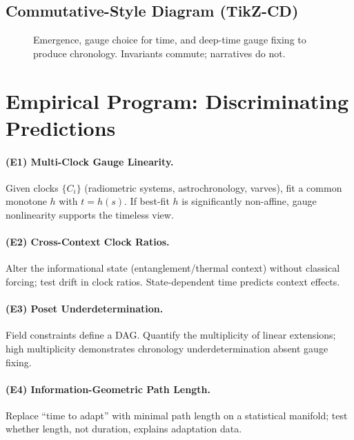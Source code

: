 \documentclass[11pt]{article}
\theoremstyle{definition}
\theoremstyle{plain}
\theoremstyle{remark}
\newcommand{\Ecat}{\mathbf{E}}      %
\newcommand{\ST}{\mathbf{ST}}       %
\newcommand{\F}{\mathcal{F}}        %
\newcommand{\C}{\mathcal{C}}        %
\begin{document}
\subsection{Commutative-Style Diagram (TikZ-CD)}
\begin{figure}[h!]
\centering
{}
\caption{Emergence, gauge choice for time, and deep-time gauge fixing to produce chronology. Invariants commute; narratives do not.}
\end{figure}

\section{Empirical Program: Discriminating Predictions}
\paragraph{(E1) Multi-Clock Gauge Linearity.}
Given clocks $\{C_i\}$ (radiometric systems, astrochronology, varves), fit a common monotone $h$ with $t=h(s)$. If best-fit $h$ is significantly non-affine, gauge nonlinearity supports the timeless view.

\paragraph{(E2) Cross-Context Clock Ratios.}
Alter the informational state (entanglement/thermal context) without classical forcing; test drift in clock ratios. State-dependent time predicts context effects.

\paragraph{(E3) Poset Underdetermination.}
Field constraints define a DAG. Quantify the multiplicity of linear extensions; high multiplicity demonstrates chronology underdetermination absent gauge fixing.

\paragraph{(E4) Information-Geometric Path Length.}
Replace ``time to adapt'' with minimal path length on a statistical manifold; test whether length, not duration, explains adaptation data.
\end{document}
